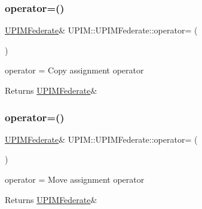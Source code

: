\subsubsection{\texorpdfstring{operator=()}{operator=()}\hspace{0.1cm}{\footnotesize\ttfamily [1/2]}}
{\footnotesize\ttfamily \hyperlink{classUPIM_1_1UPIMFederate}{U\+P\+I\+M\+Federate}\& U\+P\+I\+M\+::\+U\+P\+I\+M\+Federate\+::operator= (\begin{DoxyParamCaption}\item[{const \hyperlink{classUPIM_1_1UPIMFederate}{U\+P\+I\+M\+Federate} \&}]{ }\end{DoxyParamCaption})\hspace{0.3cm}{\ttfamily [delete]}}



operator = Copy assignment operator 

\begin{DoxyReturn}{Returns}
\hyperlink{classUPIM_1_1UPIMFederate}{U\+P\+I\+M\+Federate}\& 
\end{DoxyReturn}
\mbox{\label{classUPIM_1_1UPIMFederate_a6241cb2905a5d09c7845a16d5f42fe98}} 
\subsubsection{\texorpdfstring{operator=()}{operator=()}\hspace{0.1cm}{\footnotesize\ttfamily [2/2]}}
{\footnotesize\ttfamily \hyperlink{classUPIM_1_1UPIMFederate}{U\+P\+I\+M\+Federate}\& U\+P\+I\+M\+::\+U\+P\+I\+M\+Federate\+::operator= (\begin{DoxyParamCaption}\item[{\hyperlink{classUPIM_1_1UPIMFederate}{U\+P\+I\+M\+Federate} \&\&}]{ }\end{DoxyParamCaption})\hspace{0.3cm}{\ttfamily [default]}}



operator = Move assignment operator 

\begin{DoxyReturn}{Returns}
\hyperlink{classUPIM_1_1UPIMFederate}{U\+P\+I\+M\+Federate}\& 
\end{DoxyReturn}


